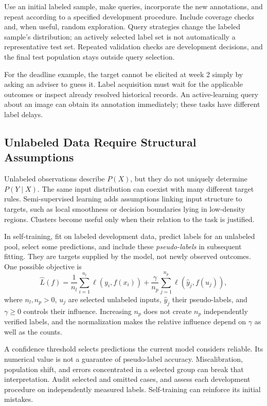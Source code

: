 Use an initial labeled sample, make queries, incorporate the new annotations, and repeat according to a specified development procedure. Include coverage checks and, when useful, random exploration. Query strategies change the labeled sample's distribution; an actively selected label set is not automatically a representative test set. Repeated validation checks are development decisions, and the final test population stays outside query selection.

For the deadline example, the target cannot be elicited at week 2 simply by asking an adviser to guess it. Label acquisition must wait for the applicable outcomes or inspect already resolved historical records. An active-learning query about an image can obtain its annotation immediately; these tasks have different label delays.

\subsection{Unlabeled Data Require Structural Assumptions}
\label{sec:fewer-labels}

Unlabeled observations describe $P(X)$, but they do not uniquely determine $P(Y\mid X)$. The same input distribution can coexist with many different target rules. Semi-supervised learning adds assumptions linking input structure to targets, such as local smoothness or decision boundaries lying in low-density regions. Clusters become useful only when their relation to the task is justified.

In self-training, fit on labeled development data, predict labels for an unlabeled pool, select some predictions, and include these \emph{pseudo-labels} in subsequent fitting. They are targets supplied by the model, not newly observed outcomes. One possible objective is
\[
\hat L(f)=\frac1{n_l}\sum_{i=1}^{n_l}\ell(y_i,f(x_i))
+\frac{\gamma}{n_p}\sum_{j=1}^{n_p}\ell(\hat y_j,f(u_j)),
\]
where $n_l,n_p>0$, $u_j$ are selected unlabeled inputs, $\hat y_j$ their pseudo-labels, and $\gamma\ge0$ controls their influence. Increasing $n_p$ does not create $n_p$ independently verified labels, and the normalization makes the relative influence depend on $\gamma$ as well as the counts.

A confidence threshold selects predictions the current model considers reliable. Its numerical value is not a guarantee of pseudo-label accuracy. Miscalibration, population shift, and errors concentrated in a selected group can break that interpretation. Audit selected and omitted cases, and assess each development procedure on independently measured labels. Self-training can reinforce its initial mistakes.

